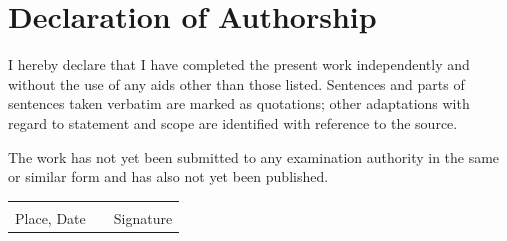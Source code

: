\documentclass[12pt, a4paper]{report}
\begin{document}
\newpage
\chapter*{Declaration of Authorship}


I hereby declare that I have completed the present work independently and without the use of any aids other than those listed. Sentences and parts of sentences taken verbatim are marked as quotations; other adaptations with regard to statement and scope are identified with reference to the source. \par
\vspace{1cm}
The work has not yet been submitted to any examination authority in the same or similar form and has also not yet been published.\par
\vspace{3cm}

\noindent
\begin{tabular}{@{}p{6cm}p{2cm}p{6cm}@{}}
\hrulefill & & \hrulefill \\
Place, Date & & Signature
\end{tabular}
\end{document}
